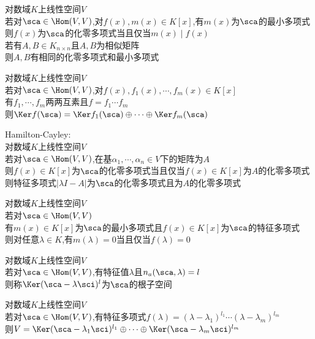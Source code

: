 \begin{dingli}
对数域$K$上线性空间$V$\\
若对$\sca\in \Hom(V,V)$,对$f(x),m(x)\in K[x]$,有$m(x)$为$\sca$的最小多项式\\
则$f(x)$为$\sca$的化零多项式当且仅当$m(x)\mid f(x)$\\
若有$A,B\in K_{n\times n}$且$A,B$为相似矩阵\\
则$A,B$有相同的化零多项式和最小多项式
\end{dingli}

\begin{dingli}
对数域$K$上线性空间$V$\\
若对$\sca\in \Hom(V,V)$,对$f(x),f_1(x),\cdots,f_m(x)\in K[x]$\\
有$f_1,\cdots,f_m$两两互素且$f=f_1\cdots f_m$\\
则$\Ker f(\sca)=\Ker f_1(\sca)\oplus\cdots\oplus\Ker f_m(\sca)$
\end{dingli}

\begin{dingli}
Hamilton-Cayley:\\
对数域$K$上线性空间$V$\\
若对$\sca\in \Hom(V,V)$,在基$\alpha_1,\cdots,\alpha_n\in V$下的矩阵为$A$\\
则$f(x)\in K[x]$为$\sca$的化零多项式当且仅当$f(x)\in K[x]$为$A$的化零多项式\\
则特征多项式$|\lambda I-A|$为$\sca$的化零多项式且为$A$的化零多项式
\end{dingli}

\begin{dingli}
对数域$K$上线性空间$V$\\
若对$\sca\in \Hom(V,V)$\\
有$m(x)\in K[x]$为$\sca$的最小多项式且$f(x)\in K[x]$为$\sca$的特征多项式\\
则对任意$\lambda\in K$,有$m(\lambda)=0$当且仅当$f(\lambda)=0$
\end{dingli}

\begin{dingli}
对数域$K$上线性空间$V$\\
若对$\sca\in \Hom(V,V)$,有特征值$\lambda$且$n_a(\sca,\lambda)=l$\\
则称$\Ker(\sca-\lambda\sci)^{l}$为$\sca$的根子空间
\end{dingli}

\begin{dingli}
对数域$K$上线性空间$V$\\
若对$\sca\in \Hom(V,V)$,有特征多项式$f(\lambda)=(\lambda-\lambda_1)^{l_1}\cdots(\lambda-\lambda_m)^{l_m}$\\
则$V=\Ker(\sca-\lambda_1\sci)^{l_1}\oplus\cdots\oplus\Ker(\sca-\lambda_m\sci)^{l_m}$
\end{dingli}

